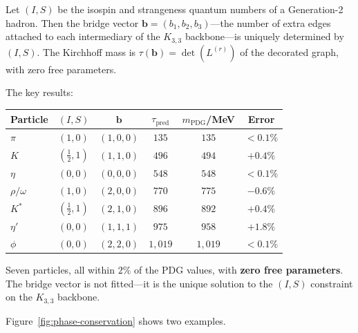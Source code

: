 \documentclass[11pt, a4paper, openany]{book}
\newcounter{thm}[chapter]
\begin{document}
\begin{theorem}\label{thm:phase-conservation}
Let $(I, S)$ be the isospin and strangeness quantum numbers of a
Generation-2 hadron.  Then the bridge vector
$\mathbf{b} = (b_1, b_2, b_3)$---the number of extra edges attached to
each intermediary of the $K_{3,3}$ backbone---is uniquely determined by
$(I, S)$.  The Kirchhoff mass is $\tau(\mathbf{b}) = \det(L^{(r)})$
of the decorated graph, with zero free parameters.
\end{theorem}

\noindent
The key results:

\medskip
\begin{center}
\renewcommand{\arraystretch}{1.3}
\begin{tabular}{lccccc}
\toprule
Particle & $(I, S)$ & $\mathbf{b}$ & $\tau_{\mathrm{pred}}$
  & $m_{\mathrm{PDG}}$/MeV & Error \\
\midrule
$\pi$      & $(1, 0)$ & $(1,0,0)$ & $135$   & $135$  & $<0.1\%$ \\
$K$        & $(\frac{1}{2}, 1)$ & $(1,1,0)$ & $496$ & $494$  & $+0.4\%$ \\
$\eta$     & $(0, 0)$ & $(0,0,0)$ & $548$ & $548$  & $<0.1\%$ \\
$\rho/\omega$ & $(1, 0)$ & $(2,0,0)$ & $770$ & $775$  & $-0.6\%$ \\
$K^*$      & $(\frac{1}{2}, 1)$ & $(2,1,0)$ & $896$ & $892$  & $+0.4\%$ \\
$\eta'$    & $(0, 0)$ & $(1,1,1)$ & $975$ & $958$  & $+1.8\%$ \\
$\phi$     & $(0, 0)$ & $(2,2,0)$ & $1{,}019$ & $1{,}019$ & $<0.1\%$ \\
\bottomrule
\end{tabular}
\end{center}

\medskip\noindent
Seven particles, all within $2\%$ of the PDG values, with \textbf{zero
free parameters}.  The bridge vector is not fitted---it is the unique
solution to the $(I, S)$ constraint on the $K_{3,3}$ backbone.

Figure~\ref{fig:phase-conservation} shows two examples.
\end{document}
